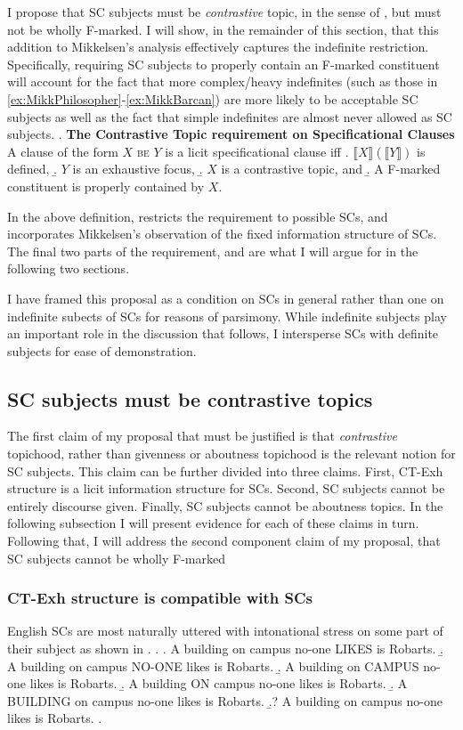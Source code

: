 \documentclass[letterpaper]{article}
\begin{document}
I propose that SC subjects must be \textit{contrastive} topic, in the sense of \textcite{constant2014diss}, but must not be wholly F-marked.
I will show, in the remainder of this section, that this addition to Mikkelsen's analysis effectively captures the indefinite restriction.
Specifically, requiring SC subjects to properly contain an F-marked constituent will account for the fact that more complex/heavy indefinites (such as those in \ref{ex:MikkPhilosopher}-\ref{ex:MikkBarcan}) are more likely to be acceptable SC subjects as well as the fact that simple indefinites are almost never allowed as SC subjects.
\ex.\label{ex:CTReq} \textbf{The Contrastive Topic requirement on Specificational Clauses}\\
A clause of the form $X$ \textsc{be} $Y$ is a licit specificational clause iff
\a. $\llbracket X\rrbracket(\llbracket Y\rrbracket)$ is defined,
\b. $Y$ is an exhaustive focus, \parencite{mikkelsen2005copular}
\b. $X$ is a contrastive topic, and
\b. A F-marked constituent is properly contained by $X$.

In the above definition, \Last[a] restricts the requirement to possible SCs, and \Last[b] incorporates Mikkelsen's observation of the fixed information structure of SCs.
The final two parts of the requirement, \Last[c] and \Last[d] are what I will argue for in the following two sections.

I have framed this proposal as a condition on SCs in general rather than one on indefinite subects of SCs for reasons of parsimony.
While indefinite subjects play an important role in the discussion that follows, I intersperse SCs with definite subjects for ease of demonstration.

\subsection{SC subjects must be contrastive topics}
The first claim of my proposal that must be justified is that \textit{contrastive} topichood, rather than givenness or aboutness topichood is the relevant notion for SC subjects.
This claim can be further divided into three claims.
First, CT-Exh structure is a licit information structure for SCs.
Second, SC subjects cannot be entirely discourse given.
Finally, SC subjects cannot be aboutness topics.
In the following subsection I will present evidence for each of these claims in turn.
Following that, I will address the second component claim of my proposal, that SC subjects cannot be wholly F-marked
\subsubsection{CT-Exh structure is compatible with SCs}\label{sec:CanBeCTs}
English SCs are most naturally uttered with intonational stress on some part of their subject as shown in \Next.
\ex.
\a. A building on campus no-one LIKES is Robarts.
\b. A building on campus NO-ONE likes is Robarts.
\b. A building on CAMPUS no-one likes is Robarts.
\b. A building ON campus no-one likes is Robarts.
\b. A BUILDING on campus no-one likes is Robarts.
\b.? A building on campus no-one likes is Robarts.
\z.
\end{document}
